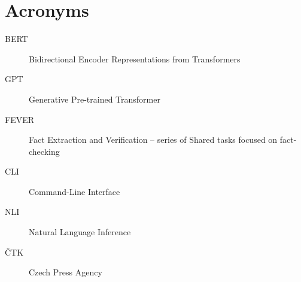 \documentclass[oneside]{ctuthesis}
\theoremstyle{plain}
\theoremstyle{definition}
\theoremstyle{note}
\begin{document}
\maketitle







%


\appendix
%
\chapter{Acronyms}
\begin{description}
\item[BERT] Bidirectional Encoder Representations from Transformers
\item[GPT] Generative Pre-trained Transformer 
\item[FEVER] Fact Extraction and Verification -- series of Shared tasks focused on fact-checking
\item[CLI] Command-Line Interface
\item[NLI] Natural Language Inference
\item[ČTK] Czech Press Agency
\end{description}
\end{document}
